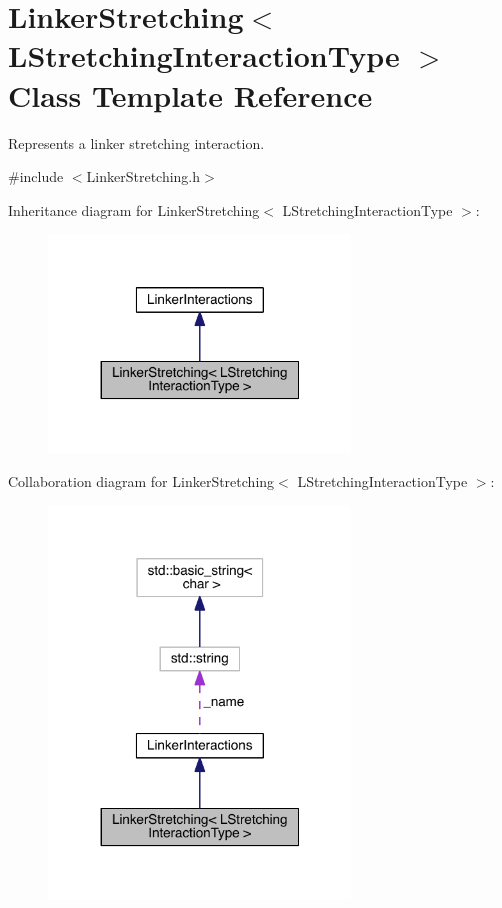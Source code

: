 \hypertarget{classLinkerStretching}{\section{Linker\+Stretching$<$ L\+Stretching\+Interaction\+Type $>$ Class Template Reference}
\label{classLinkerStretching}
}


Represents a linker stretching interaction.  




{\ttfamily \#include $<$Linker\+Stretching.\+h$>$}



Inheritance diagram for Linker\+Stretching$<$ L\+Stretching\+Interaction\+Type $>$\+:\nopagebreak
\begin{figure}[H]
\begin{center}
\leavevmode
\includegraphics[width=227pt]{classLinkerStretching__inherit__graph}
\end{center}
\end{figure}


Collaboration diagram for Linker\+Stretching$<$ L\+Stretching\+Interaction\+Type $>$\+:\nopagebreak
\begin{figure}[H]
\begin{center}
\leavevmode
\includegraphics[width=227pt]{classLinkerStretching__coll__graph}
\end{center}
\end{figure}
